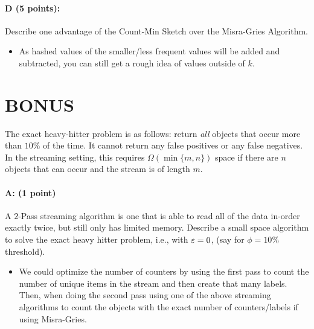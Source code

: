 \documentclass[11pt]{article}
\begin{document}
\paragraph{D (5 points):}  
Describe one advantage of the Count-Min Sketch over the Misra-Gries Algorithm.  

\begin{itemize}
\item As hashed values of the smaller/less frequent values will be added and subtracted, you can still get a rough idea of values outside of $k$.
\end{itemize} 
\section{BONUS}

The exact heavy-hitter problem is as follows: return \emph{all} objects that occur more than $10\%$ of the time.  It cannot return any false positives or any false negatives.  In the streaming setting, this requires $\Omega(\min\{m,n\})$ space if there are $n$ objects that can occur and the stream is of length $m$.  

\paragraph{A: (1 point)}
A $2$-Pass streaming algorithm is one that is able to read all of the data in-order exactly twice, but still only has limited memory.  Describe a small space algorithm to solve the exact heavy hitter problem, i.e., with $\varepsilon =0$, (say for $\phi = 10\%$ threshold).  

\begin{itemize}
\item We could optimize the number of counters by using the first pass to count the number of unique items in the stream and then create that many labels. Then, when doing the second pass using one of the above streaming algorithms to count the objects with the exact number of counters/labels if using Misra-Gries. 
\end{itemize}
\end{document}
